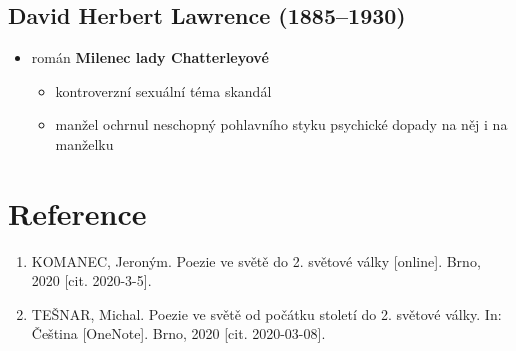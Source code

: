 \subsection{David Herbert Lawrence (1885--1930)}
\begin{itemize}
\item román \textbf{Milenec lady Chatterleyové}
	\begin{itemize}
	\item kontroverzní sexuální téma \ra skandál
	\item manžel ochrnul \ra neschopný pohlavního styku \ra psychické dopady na něj i na manželku
	\end{itemize}
\end{itemize}

\newpage
\section{Reference}
\begin{enumerate}
\item KOMANEC, Jeroným. Poezie ve světě do 2. světové války [online]. Brno, 2020 [cit. 2020-3-5].
\item TEŠNAR, Michal. Poezie ve světě od počátku století do 2. světové války. In: Čeština [OneNote]. Brno, 2020 [cit. 2020-03-08].

\end{enumerate}


	

